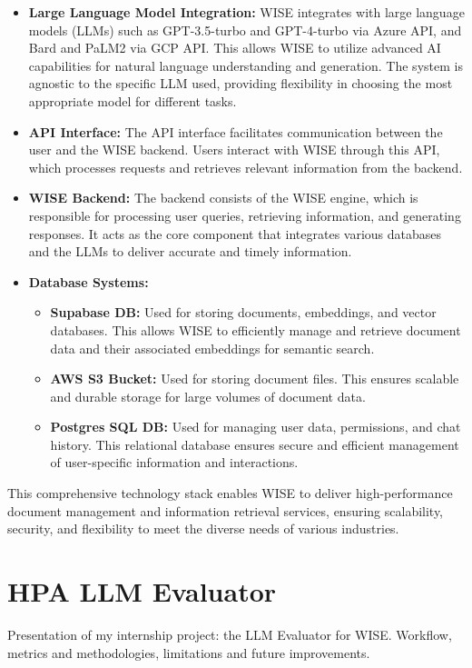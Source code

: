 \begin{itemize}
    \item \textbf{Large Language Model Integration:} WISE integrates with large language models (LLMs) such as GPT-3.5-turbo and GPT-4-turbo via Azure API, and Bard and PaLM2 via GCP API. This allows WISE to utilize advanced AI capabilities for natural language understanding and generation. The system is agnostic to the specific LLM used, providing flexibility in choosing the most appropriate model for different tasks.

    \item \textbf{API Interface:} The API interface facilitates communication between the user and the WISE backend. Users interact with WISE through this API, which processes requests and retrieves relevant information from the backend.

    \item \textbf{WISE Backend:} The backend consists of the WISE engine, which is responsible for processing user queries, retrieving information, and generating responses. It acts as the core component that integrates various databases and the LLMs to deliver accurate and timely information.

    \item \textbf{Database Systems:} 
    \begin{itemize}
        \item \textbf{Supabase DB:} Used for storing documents, embeddings, and vector databases. This allows WISE to efficiently manage and retrieve document data and their associated embeddings for semantic search.
        \item \textbf{AWS S3 Bucket:} Used for storing document files. This ensures scalable and durable storage for large volumes of document data.
        \item \textbf{Postgres SQL DB:} Used for managing user data, permissions, and chat history. This relational database ensures secure and efficient management of user-specific information and interactions.
    \end{itemize}
\end{itemize}

This comprehensive technology stack enables WISE to deliver high-performance document management and information retrieval services, ensuring scalability, security, and flexibility to meet the diverse needs of various industries. \cite{hpa2024}


\section{HPA LLM Evaluator}
Presentation of my internship project: the LLM Evaluator for WISE. Workflow, metrics and methodologies, limitations and future improvements.

